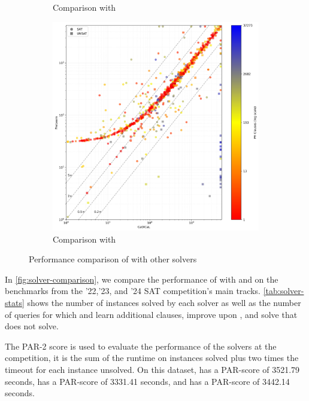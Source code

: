 \begin{figure}[!t]
\begin{subfigure}[t]{0.3\textwidth}
        \caption{Comparison with \prelearn}
        \label{fig:cautical-vs-prelearn}
    \end{subfigure}
    \begin{subfigure}[t]{0.3\textwidth}
        \centering
        \includegraphics[width=\textwidth]{figs/cadical_vs_prelearn.jpg}
        \caption{Comparison with \prelearn}
        \label{fig:cautical-vs-prelearn}
    \end{subfigure}
    \caption{Performance comparison of \tool with other solvers}
    \label{fig:solver-comparison}
\end{figure}

In \autoref{fig:solver-comparison}, we compare the performance of \tool with \cadical and \prelearn on the benchmarks from the '22,'23, and '24 SAT competition's main tracks. \autoref{tab:solver-stats} shows the number of instances solved by each solver as well as the number of queries for which \prelearn and \cadical learn additional clauses, improve upon \cadical, and solve that \cadical does not solve.

The PAR-2 score is used to evaluate the performance of the solvers at the competition, it is the sum of the runtime on instances solved plus two times the timeout for each instance unsolved. On this dataset, \cadical has a PAR-score of 3521.79 seconds, \prelearn has a PAR-score of 3331.41 seconds, and \tool has a PAR-score of 3442.14 seconds.

